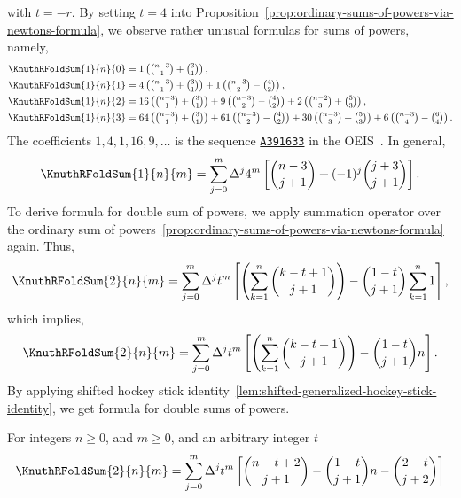 with $t=-r$.
By setting $t=4$ into
Proposition~\eqref{prop:ordinary-sums-of-powers-via-newtons-formula},
we observe rather unusual formulas for sums of powers, namely,
\begin{align*}
  \KnuthRFoldSum{1}{n}{0} &= 1  \left( \tbinom{n-3}{1}
  + \tbinom{3}{1}  \right), \\
  \KnuthRFoldSum{1}{n}{1} &= 4  \left( \tbinom{n-3}{1}
  + \tbinom{3}{1}  \right)  + 1  \left( \tbinom{n-3}{2}
  - \tbinom{4}{2}  \right), \\
  \KnuthRFoldSum{1}{n}{2} &= 16 \left( \tbinom{n-3}{1}
  + \tbinom{3}{1}  \right)  + 9  \left( \tbinom{n-3}{2}
  - \tbinom{4}{2}  \right)
  + 2  \left( \tbinom{n-2}{3} + \tbinom{5}{3}  \right), \\
  \KnuthRFoldSum{1}{n}{3} &= 64 \left( \tbinom{n-3}{1}
  + \tbinom{3}{1}  \right)  + 61 \left( \tbinom{n-3}{2}
  - \tbinom{4}{2}  \right)
  + 30 \left( \tbinom{n-3}{3} + \tbinom{5}{3}  \right)
  + 6 \left( \tbinom{n-3}{4} - \tbinom{6}{4}  \right).
\end{align*}
The coefficients $1,4,1,16,9,\dots$ is the sequence
\href{https://oeis.org/A391633}{\texttt{A391633}}
in the OEIS~\cite{sloane2003line}.
In general,
\begin{align*}
  \KnuthRFoldSum{1}{n}{m} = \sum_{j=0}^{m} \Delta^{j} 4^m
  \left[
    \binom{n-3}{j+1} + (-1)^j \binom{j+3}{j+1}
  \right].
\end{align*}
To derive formula for double sum of powers,
we apply summation operator over the ordinary
sum of powers~\eqref{prop:ordinary-sums-of-powers-via-newtons-formula} again.
Thus,
\begin{align*}
  \KnuthRFoldSum{2}{n}{m} = \sum_{j=0}^{m} \Delta^{j} t^m
  \left[ \left( \sum_{k=1}^{n} \binom{k-t+1}{j+1} \right) -
    \binom{1-t}{j+1} \sum_{k=1}^{n} 1
  \right],
\end{align*}
which implies,
\begin{align*}
  \KnuthRFoldSum{2}{n}{m}
  = \sum_{j=0}^{m} \Delta^{j} t^m
  \left[
    \left( \sum_{k=1}^{n} \binom{k-t+1}{j+1} \right) - \binom{1-t}{j+1} n
  \right].
\end{align*}
By applying shifted hockey stick
identity~\eqref{lem:shifted-generalized-hockey-stick-identity},
we get formula for double sums of powers.
\begin{proposition}
  \label{prop:double-sums-of-powers-via-newtons-formula}
  For integers $n\geq 0$, and $m\geq 0$, and an arbitrary integer $t$
  \begin{align*}
    \KnuthRFoldSum{2}{n}{m}
    = \sum_{j=0}^{m} \Delta^{j} t^m
    \left[
      \binom{n-t+2}{j+1} - \binom{1-t}{j+1} n - \binom{2-t}{j+2}
    \right]
  \end{align*}
\end{proposition}

